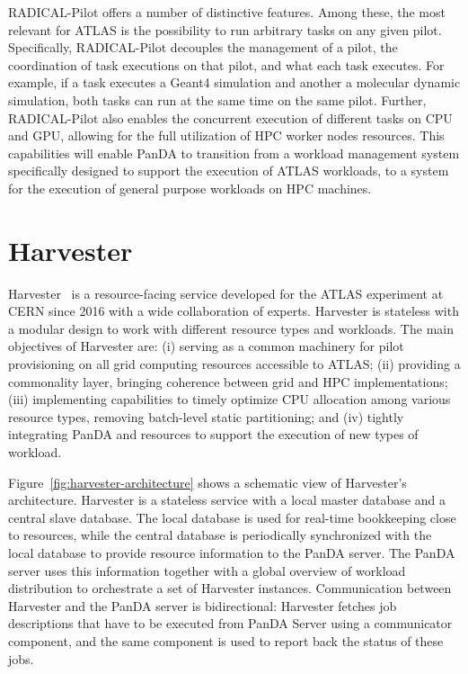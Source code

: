 \documentclass{webofc}
\begin{document}
RADICAL-Pilot offers a number of distinctive features. Among these, the most
relevant for ATLAS is the possibility to run arbitrary tasks on any given
pilot. Specifically, RADICAL-Pilot decouples the management of a pilot, the
coordination of task executions on that pilot, and what each task executes.
For example, if a task executes a Geant4 simulation and another a molecular
dynamic simulation, both tasks can run at the same time on the same pilot.
Further, RADICAL-Pilot also enables the concurrent execution of different
tasks on CPU and GPU, allowing for the full utilization of HPC worker nodes
resources. This capabilities will enable PanDA to transition from a workload
management system specifically designed to support the execution of ATLAS
workloads, to a system for the execution of general purpose workloads on HPC
machines.


\section{Harvester}

Harvester~\cite{harvester} is a resource-facing service developed for the
ATLAS experiment at CERN since 2016 with a wide collaboration of experts.
Harvester is stateless with a modular design to work with different resource
types and workloads. The main objectives of Harvester are: (i) serving as a
common machinery for pilot provisioning on all grid computing resources
accessible to ATLAS; (ii) providing a commonality layer, bringing coherence
between grid and HPC implementations; (iii) implementing capabilities to
timely optimize CPU allocation among various resource types, removing
batch-level static partitioning; and (iv) tightly integrating PanDA and
resources to support the execution of new types of workload.

Figure~\ref{fig:harvester-architecture} shows a schematic view of Harvester's
architecture. Harvester is a stateless service with a local master database
and a central slave database. The local database is used for real-time
bookkeeping close to resources, while the central database is periodically
synchronized with the local database to provide resource information to the
PanDA server. The PanDA server uses this information together with a global
overview of workload distribution to orchestrate a set of Harvester
instances. Communication between Harvester and the PanDA server is
bidirectional: Harvester fetches job descriptions that have to be executed
from PanDA Server using a communicator component, and the same component is
used to report back the status of these jobs.
\end{document}
